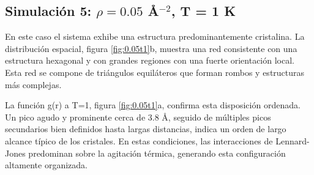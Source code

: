 \subsection{Simulación 5: $\rho = 0.05$ \AA$^{-2}$, T = 1 K}


En este caso el sistema exhibe una estructura predominantemente cristalina. La distribución espacial, figura \ref{fig:0.05t1}b, muestra una red consistente con una estructura hexagonal y con grandes regiones con una fuerte orientación local. Esta red se compone de triángulos equiláteros que forman rombos y estructuras más complejas. 

\vspace{\baselineskip}
	
La función g(r) a T=1, figura \ref{fig:0.05t1}a,  confirma esta disposición ordenada. Un pico agudo y prominente cerca de 3.8 \AA, seguido de múltiples picos secundarios bien definidos hasta largas distancias, indica un orden de largo alcance típico de los cristales. En estas condiciones, las interacciones de Lennard-Jones predominan sobre la agitación térmica, generando esta configuración altamente organizada.


